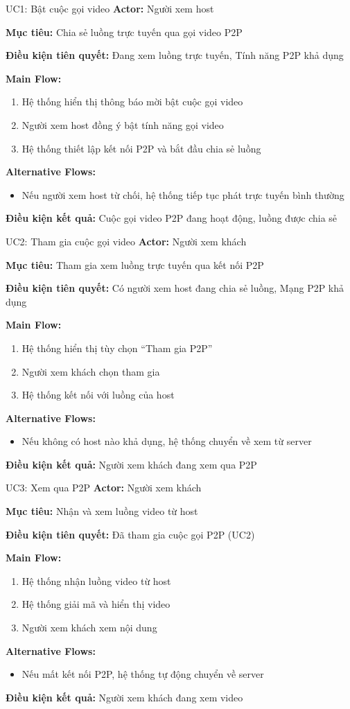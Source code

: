 \documentclass[12pt,a4paper]{article}
\newcommand{\usecasefield}[2]{%
    \textbf{#1:} #2 \par\vspace{2pt}
}
\newenvironment{mainflow}{
    \par\vspace{4pt}
    \textbf{Main Flow:}
    \begin{enumerate}[leftmargin=*, label=\arabic*., itemsep=2pt]
}{
    \end{enumerate}
}
\newenvironment{altflow}{
    \par\vspace{4pt}
    \textbf{Alternative Flows:}
    \begin{itemize}[leftmargin=*, label=\textendash, itemsep=2pt]
}{
    \end{itemize}
}
\begin{document}
\begin{usecase}{UC1: Bật cuộc gọi video}
    \usecasefield{Actor}{Người xem host}
    \usecasefield{Mục tiêu}{Chia sẻ luồng trực tuyến qua gọi video P2P}
    \usecasefield{Điều kiện tiên quyết}{Đang xem luồng trực tuyến, Tính năng P2P khả dụng}
    \begin{mainflow}
        \item Hệ thống hiển thị thông báo mời bật cuộc gọi video
        \item Người xem host đồng ý bật tính năng gọi video
        \item Hệ thống thiết lập kết nối P2P và bắt đầu chia sẻ luồng
    \end{mainflow}
    \begin{altflow}
        \item Nếu người xem host từ chối, hệ thống tiếp tục phát trực tuyến bình thường
    \end{altflow}
    \usecasefield{Điều kiện kết quả}{Cuộc gọi video P2P đang hoạt động, luồng được chia sẻ}
\end{usecase}

\begin{usecase}{UC2: Tham gia cuộc gọi video}
    \usecasefield{Actor}{Người xem khách}
    \usecasefield{Mục tiêu}{Tham gia xem luồng trực tuyến qua kết nối P2P}
    \usecasefield{Điều kiện tiên quyết}{Có người xem host đang chia sẻ luồng, Mạng P2P khả dụng}
    \begin{mainflow}
        \item Hệ thống hiển thị tùy chọn ``Tham gia P2P''
        \item Người xem khách chọn tham gia
        \item Hệ thống kết nối với luồng của host
    \end{mainflow}
    \begin{altflow}
        \item Nếu không có host nào khả dụng, hệ thống chuyển về xem từ server
    \end{altflow}
    \usecasefield{Điều kiện kết quả}{Người xem khách đang xem qua P2P}
\end{usecase}

\begin{usecase}{UC3: Xem qua P2P}
    \usecasefield{Actor}{Người xem khách}
    \usecasefield{Mục tiêu}{Nhận và xem luồng video từ host}
    \usecasefield{Điều kiện tiên quyết}{Đã tham gia cuộc gọi P2P (UC2)}
    \begin{mainflow}
        \item Hệ thống nhận luồng video từ host
        \item Hệ thống giải mã và hiển thị video
        \item Người xem khách xem nội dung
    \end{mainflow}
    \begin{altflow}
        \item Nếu mất kết nối P2P, hệ thống tự động chuyển về server
    \end{altflow}
    \usecasefield{Điều kiện kết quả}{Người xem khách đang xem video}
\end{usecase}
\end{document}
